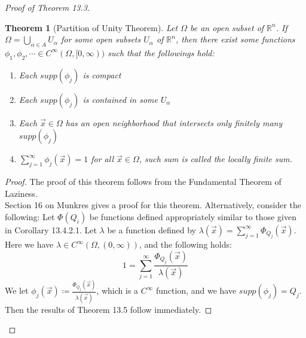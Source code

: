 \documentclass[11pt,oneside]{book}
\theoremstyle{break}
\theoremstyle{break}
\newtheorem{thm}{Theorem}[section]
\newcommand{\R}{\mathbb{R}}
\begin{document}
\begin{proof}[Proof of Theorem 13.3]
\newpage
\begin{thm}[Partition of Unity Theorem]
\setlength{\leftskip}{1cm}Let $\Omega$ be an open subset of $\R^n$. If $\Omega = \bigcup_{\alpha \in A} U_\alpha$ for some open subsets $U_\alpha$ of $\R^n$, then there exist some functions $\phi_1,\phi_2,\cdots \in C^\infty(\Omega, [0,\infty))$ such that the followings hold:
\begin{enumerate}[topsep=3pt,itemsep=-1ex,partopsep=1ex,parsep=1ex,leftmargin=1.5cm]
\item Each $supp(\phi_j)$ is compact
\item Each $supp(\phi_j)$ is contained in some $U_\alpha$
\item Each $\vec{x}\in \Omega$  has an open neighborhood that intersects only finitely many $supp(\phi_j)$
\item $\sum_{j=1}^\infty \phi_j(\vec{x}) = 1$ for all $\vec{x}\in \Omega$, such sum is called the locally finite sum.
\end{enumerate}
\end{thm}
\begin{proof}\setlength{\leftskip}{1cm}
The proof of this theorem follows from the Fundamental Theorem of Laziness.\\ Section 16 on Munkres gives a proof for this theorem. Alternatively, consider the following:
Let $\Phi(Q_i)$ be functions defined appropriately similar to those given in Corollary 13.4.2.1. Let $\lambda$ be a function defined by $\lambda(\vec{x}) = \sum_{j=1}^\infty \Phi_{Q_j}(\vec{x})$. Here we have $\lambda \in C^\infty(\Omega,(0,\infty))$, and the following holds: $$1 = \sum_{j=1}^\infty \frac{\Phi_{Q_j}(\vec{x})}{\lambda(\vec{x})} $$ We let $\phi_j(\vec{x}) \coloneqq \frac{\Phi_{Q_j}(\vec{x})}{\lambda(\vec{x})}$, which is a $C^\infty$ function, and we have $supp(\phi_j) =Q_j$. Then the results of Theorem 13.5 follow immediately. 
\end{proof}


\end{proof}
\end{document}
